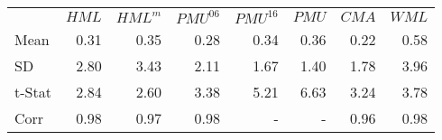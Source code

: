 \begin{table}[!ht]
\begin{tabular}{lrrrrrrr}
  \toprule
         & $HML$  & $HML^m$&$PMU^{06}$&$PMU^{16}$&$PMU$& $CMA$ & $WML$ \\
  Mean   &  0.31  &  0.35  &  0.28  &  0.34  &  0.36  &  0.22  &  0.58 \\
  SD     &  2.80  &  3.43  &  2.11  &  1.67  &  1.40  &  1.78  &  3.96 \\
  t-Stat &  2.84  &  2.60  &  3.38  &  5.21  &  6.63  &  3.24  &  3.78 \\
  Corr   &  0.98  &  0.97  &  0.98  &    -   &    -   &  0.96  &  0.98 \\
  \bottomrule
\end{tabular}
\end{table}

